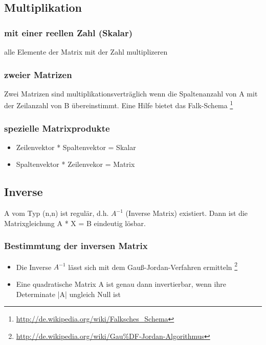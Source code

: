 \documentclass[a4paper,12pt]{scrartcl}
\begin{document}
\subsection{Multiplikation}
\subsubsection{mit einer reellen Zahl (Skalar)}
alle Elemente der Matrix mit der Zahl multiplizeren

\subsubsection{zweier Matrizen}
Zwei Matrizen sind multiplikationsverträglich wenn die Spaltenanzahl von A mit der Zeilanzahl von B übereinstimmt. 
Eine Hilfe bietet das Falk-Schema \footnote{\url{http://de.wikipedia.org/wiki/Falksches_Schema}}

\subsubsection{spezielle Matrixprodukte}
\begin{itemize}
\item Zeilenvektor * Spaltenvektor = Skalar
\item Spaltenvektor * Zeilenvekor = Matrix
\end{itemize}

\subsection{Inverse}
A vom Typ (n,n) ist regulär, d.h. $A^{-1}$ (Inverse Matrix) existiert. Dann ist die Matrixgleichung A * X = B eindeutig lösbar.
\subsubsection{Bestimmtung der inversen Matrix}
\begin{itemize}
\item Die Inverse $A^{-1}$ lässt sich mit dem Gauß-Jordan-Verfahren ermitteln \footnote{\url{http://de.wikipedia.org/wiki/Gau\%DF-Jordan-Algorithmus}}
\item Eine quadratische Matrix A ist genau dann invertierbar, wenn ihre Determinate |A| ungleich Null ist
\end{itemize}
\end{document}
